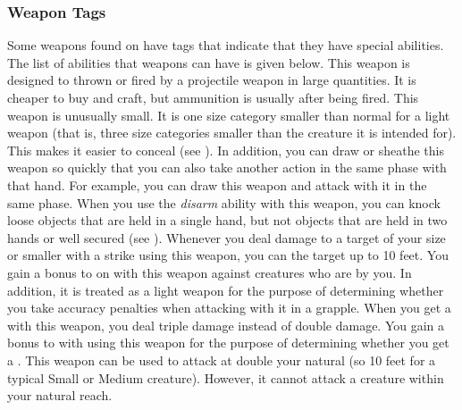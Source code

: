         \subsubsection{Weapon Tags}\label{Weapon Tags}
            Some weapons found on  have tags that indicate that they have special abilities. The list of abilities that weapons can have is given below.
             This weapon is designed to thrown or fired by a projectile weapon in large quantities. It is cheaper to buy and craft, but ammunition is usually  after being fired.
             This weapon is unusually small.
            It is one size category smaller than normal for a light weapon (that is, three size categories smaller than the creature it is intended for).
            This makes it easier to conceal (see ).
            In addition, you can draw or sheathe this weapon so quickly that you can also take another action in the same phase with that hand.
            For example, you can draw this weapon and attack with it in the same phase.
             When you use the \textit{disarm} ability with this weapon, you can knock loose objects that are held in a single hand, but not objects that are held in two hands or well secured (see ).
             Whenever you deal damage to a target of your size or smaller with a strike using this weapon, you can  the target up to 10 feet.
             You gain a  bonus to  on  with this weapon against creatures who are  by you.
            In addition, it is treated as a light weapon for the purpose of determining whether you take accuracy penalties when attacking with it in a grapple.
             When you get a  with this weapon, you deal triple damage instead of double damage.
             You gain a  bonus to  with  using this weapon for the purpose of determining whether you get a .
            \label{Long Weapon} This weapon can be used to attack at double your natural  (so 10 feet for a typical Small or Medium creature).
            However, it cannot attack a creature within your natural reach.

